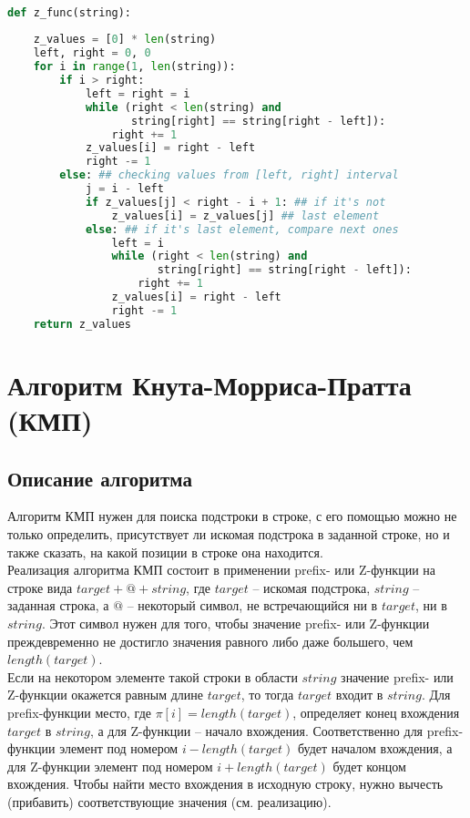 \documentclass[a4paper,12pt]{article} %
\begin{document}
\begin{lstlisting}[language=Python]

def z_func(string):
    
    z_values = [0] * len(string)
    left, right = 0, 0
    for i in range(1, len(string)):
        if i > right:
            left = right = i
            while (right < len(string) and 
            	   string[right] == string[right - left]):
                right += 1
            z_values[i] = right - left
            right -= 1
        else: ## checking values from [left, right] interval
            j = i - left
            if z_values[j] < right - i + 1: ## if it's not 
                z_values[i] = z_values[j] ## last element
            else: ## if it's last element, compare next ones
                left = i
                while (right < len(string) and 
                	   string[right] == string[right - left]):
                    right += 1
                z_values[i] = right - left
                right -= 1      
    return z_values

\end{lstlisting}

\section{Алгоритм Кнута-Морриса-Пратта (КМП)}

\subsection{Описание алгоритма}

Алгоритм КМП нужен для поиска подстроки в строке, с его помощью можно не только определить, присутствует ли искомая подстрока в заданной строке, но и также сказать, на какой позиции в строке она находится.\\

Реализация алгоритма КМП состоит в применении prefix- или Z-функции на строке вида $target+@+string$, где $target$ – искомая подстрока, $string$ – заданная строка, а $@$ – некоторый символ, не встречающийся ни в $target$, ни в $string$. Этот символ нужен для того, чтобы значение prefix- или Z-функции преждевременно не достигло значения равного либо даже большего, чем $length(target)$.\\

Если на некотором элементе такой строки в области $string$ значение prefix- или Z-функции окажется равным длине $target$, то тогда $target$ входит в $string$. Для prefix-функции место, где $\pi[i]=length(target)$, определяет конец вхождения $target$ в $string$, а для Z-функции – начало вхождения. Соответственно для prefix-функции элемент под номером $i-length(target)$ будет началом вхождения, а для Z-функции элемент под номером $i+length(target)$ будет концом вхождения. Чтобы найти место вхождения в исходную строку, нужно вычесть (прибавить) соответствующие значения (см. реализацию).\\
\end{document}
